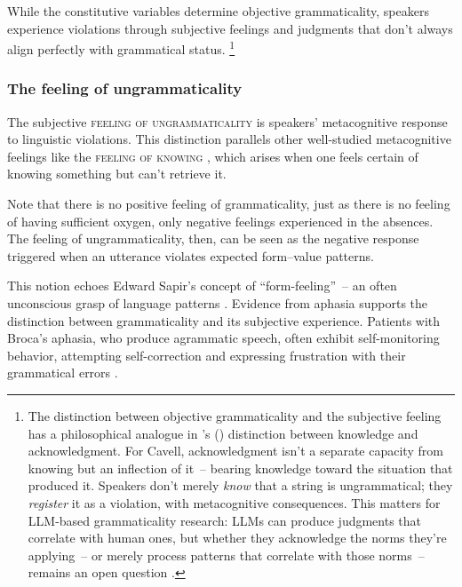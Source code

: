 \documentclass[12pt,letterpaper]{article}
\newcommand{\posscite}[1]{\citeauthor{#1}'s (\citeyear{#1})}
\begin{document}
While the constitutive variables determine objective grammaticality, speakers experience violations through subjective feelings and judgments that don't always align perfectly with grammatical status.%
\footnote{The distinction between objective grammaticality and the subjective feeling has a philosophical analogue in \posscite{Cavell1969KnowingAcknowledging} distinction between knowledge and acknowledgment. For Cavell, acknowledgment isn't a separate capacity from knowing but an inflection of it~-- bearing knowledge toward the situation that produced it. Speakers don't merely \emph{know} that a string is ungrammatical; they \emph{register} it as a violation, with metacognitive consequences. This matters for LLM-based grammaticality research: LLMs can produce judgments that correlate with human ones, but whether they acknowledge the norms they're applying~-- or merely process patterns that correlate with those norms~-- remains an open question \autocite{Techio2026ClaimTrainingData}.}

\subsubsection{The feeling of ungrammaticality}\label{sec:feeling}

The subjective \textsc{feeling of ungrammaticality} is speakers' metacognitive response to linguistic violations. This distinction parallels other well-studied metacognitive feelings like the \textsc{feeling of knowing} \autocite[FOK;][]{hart1965}, which arises when one feels certain of knowing something but can't retrieve it.

Note that there is no positive feeling of grammaticality, just as there is no feeling of having sufficient oxygen, only negative feelings experienced in the absences. The feeling of ungrammaticality, then, can be seen as the negative response triggered when an utterance violates expected form--value patterns.

This notion echoes Edward Sapir's concept of \enquote{form-feeling}~-- an often unconscious grasp of language patterns \autocite{Sapir1921, Sapir1927b}. Evidence from aphasia supports the distinction between grammaticality and its subjective experience. Patients with Broca's aphasia, who produce agrammatic speech, often exhibit self-monitoring behavior, attempting self-correction and expressing frustration with their grammatical errors \autocite{oomen2005}.
\end{document}
